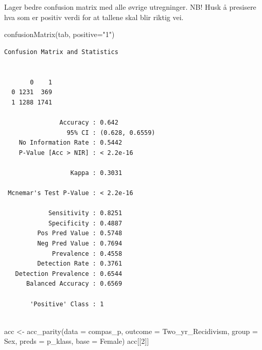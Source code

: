 \documentclass[
  letterpaper,
  DIV=11,
  numbers=noendperiod]{scrreprt}
\newenvironment{Shaded}{\begin{snugshade}}{\end{snugshade}}
\newcommand{\AttributeTok}[1]{\textcolor[rgb]{0.40,0.45,0.13}{#1}}
\newcommand{\DecValTok}[1]{\textcolor[rgb]{0.68,0.00,0.00}{#1}}
\newcommand{\FunctionTok}[1]{\textcolor[rgb]{0.28,0.35,0.67}{#1}}
\newcommand{\NormalTok}[1]{\textcolor[rgb]{0.00,0.23,0.31}{#1}}
\newcommand{\OtherTok}[1]{\textcolor[rgb]{0.00,0.23,0.31}{#1}}
\newcommand{\StringTok}[1]{\textcolor[rgb]{0.13,0.47,0.30}{#1}}
\begin{document}
Lager bedre confusion matrix med alle øvrige utregninger. NB! Husk å
presisere hva som er positiv verdi for at tallene skal blir riktig vei.

\begin{Shaded}
\begin{Highlighting}[]
\FunctionTok{confusionMatrix}\NormalTok{(tab, }\AttributeTok{positive=}\StringTok{"1"}\NormalTok{)}
\end{Highlighting}
\end{Shaded}

\begin{verbatim}
Confusion Matrix and Statistics

   
       0    1
  0 1231  369
  1 1288 1741
                                         
               Accuracy : 0.642          
                 95% CI : (0.628, 0.6559)
    No Information Rate : 0.5442         
    P-Value [Acc > NIR] : < 2.2e-16      
                                         
                  Kappa : 0.3031         
                                         
 Mcnemar's Test P-Value : < 2.2e-16      
                                         
            Sensitivity : 0.8251         
            Specificity : 0.4887         
         Pos Pred Value : 0.5748         
         Neg Pred Value : 0.7694         
             Prevalence : 0.4558         
         Detection Rate : 0.3761         
   Detection Prevalence : 0.6544         
      Balanced Accuracy : 0.6569         
                                         
       'Positive' Class : 1              
                                         
\end{verbatim}

\begin{Shaded}
\begin{Highlighting}[]
\NormalTok{acc }\OtherTok{\textless{}{-}} \FunctionTok{acc\_parity}\NormalTok{(}\AttributeTok{data =}\NormalTok{ compas\_p, }
                  \AttributeTok{outcome      =} \StringTok{\textquotesingle{}Two\_yr\_Recidivism\textquotesingle{}}\NormalTok{, }
                  \AttributeTok{group        =} \StringTok{\textquotesingle{}Sex\textquotesingle{}}\NormalTok{,}
                  \AttributeTok{preds        =} \StringTok{\textquotesingle{}p\_klass\textquotesingle{}}\NormalTok{, }
                  \AttributeTok{base         =} \StringTok{\textquotesingle{}Female\textquotesingle{}}\NormalTok{)}
\NormalTok{acc[[}\DecValTok{2}\NormalTok{]]}
\end{Highlighting}
\end{Shaded}
\end{document}
